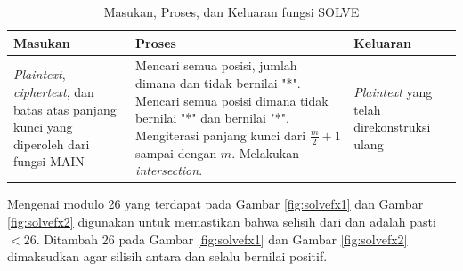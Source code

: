   \begin{table}[H]
	 	\caption{Masukan, Proses, dan Keluaran fungsi SOLVE}
		\begin{tabular}   {|p{2cm}|p{4.5cm}|p{2.5cm}|}\hline
		Masukan&Proses&Keluaran \\ \hline
		\textit{Plaintext}, \textit{ciphertext}, dan batas atas panjang kunci yang diperoleh dari fungsi MAIN&Mencari semua posisi, jumlah dimana \plaintext dan \ciphertext tidak bernilai "*". Mencari semua posisi dimana \ciphertext tidak bernilai "*" dan \plaintext bernilai "*". Mengiterasi panjang kunci dari $\frac{m}{2}+1$ sampai dengan $m$. Melakukan \textit{intersection}.  &\textit{Plaintext} yang telah direkonstruksi ulang \\ \hline
		\end{tabular}%
		\label{tab:iosolve}
	\end{table}

	Mengenai modulo 26 yang terdapat pada Gambar \ref{fig:solvefx1} dan Gambar \ref{fig:solvefx2} digunakan untuk memastikan bahwa selisih dari \plaintext dan \ciphertext adalah pasti $< 26$. Ditambah 26 pada Gambar \ref{fig:solvefx1} dan Gambar \ref{fig:solvefx2} dimaksudkan agar silisih antara \plaintext dan \ciphertext selalu bernilai positif.  
  
